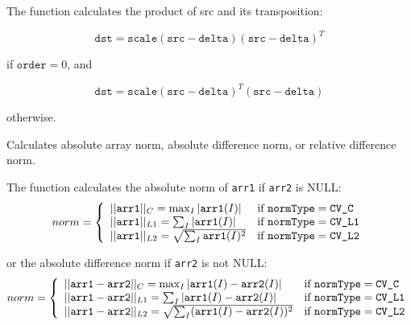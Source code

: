 
\begin{description}
\end{description}

The function calculates the product of src and its transposition:

\[
\texttt{dst}=\texttt{scale} (\texttt{src}-\texttt{delta}) (\texttt{src}-\texttt{delta})^T
\]

if $\texttt{order}=0$, and

\[
\texttt{dst}=\texttt{scale} (\texttt{src}-\texttt{delta})^T (\texttt{src}-\texttt{delta})
\]

otherwise.

Calculates absolute array norm, absolute difference norm, or relative difference norm.


\begin{description}
\end{description}

The function calculates the absolute norm of \texttt{arr1} if \texttt{arr2} is NULL:
\[
norm = \left\{ \begin{array}{l l} ||\texttt{arr1}||_C    = \max_I |\texttt{arr1}(I)| & \mbox{if $\texttt{normType} = \texttt{CV\_C}$}\\ ||\texttt{arr1}||_{L1} = \sum_I |\texttt{arr1}(I)| & \mbox{if $\texttt{normType} = \texttt{CV\_L1}$}\\ ||\texttt{arr1}||_{L2} = \sqrt{\sum_I \texttt{arr1}(I)^2} & \mbox{if $\texttt{normType} = \texttt{CV\_L2}$}\\ \end{array} \right.
\]

or the absolute difference norm if \texttt{arr2} is not NULL:
\[
norm = \left\{ \begin{array}{l l} ||\texttt{arr1}-\texttt{arr2}||_C    = \max_I |\texttt{arr1}(I) - \texttt{arr2}(I)| & \mbox{if $\texttt{normType} = \texttt{CV\_C}$}\\ ||\texttt{arr1}-\texttt{arr2}||_{L1} = \sum_I |\texttt{arr1}(I) - \texttt{arr2}(I)| & \mbox{if $\texttt{normType} = \texttt{CV\_L1}$}\\ ||\texttt{arr1}-\texttt{arr2}||_{L2} = \sqrt{\sum_I (\texttt{arr1}(I) - \texttt{arr2}(I))^2} & \mbox{if $\texttt{normType} = \texttt{CV\_L2}$}\\ \end{array} \right.
\]

